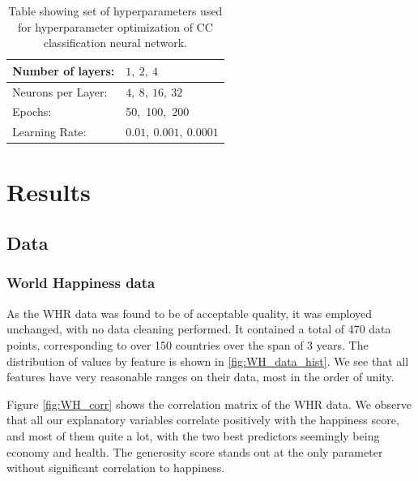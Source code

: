 \documentclass[10pt, twocolumn]{article}
\begin{document}
\begin{table}[H]
    \centering
    \begin{tabular}{l l}
        \hline
        Number of layers: & $1,\ 2,\ 4$ \\
        \hline
        Neurons per Layer: & $4,\ 8,\ 16,\ 32$ \\
        \hline
        Epochs: & 50,\ 100,\ 200 \\
        \hline
        Learning Rate: & $0.01,\ 0.001,\ 0.0001$ \\
        \hline
    \end{tabular}
    \caption{Table showing set of hyperparameters used for hyperparameter optimization of CC classification neural network.}
    \label{tab:HP_list_clas}
\end{table}




\section{Results}
\subsection{Data}
\subsubsection{World Happiness data}
As the WHR data was found to be of acceptable quality, it was employed unchanged, with no data cleaning performed. It contained a total of 470 data points, corresponding to over 150 countries over the span of 3 years. The distribution of values by feature is shown in \cref{fig:WH_data_hist}. We see that all features have very reasonable ranges on their data, most in the order of unity.

Figure \ref{fig:WH_corr} shows the correlation matrix of the WHR data. We observe that all our explanatory variables correlate positively with the happiness score, and most of them quite a lot, with the two best predictors seemingly being economy and health. The generosity score stands out at the only parameter without significant correlation to happiness.
\end{document}
